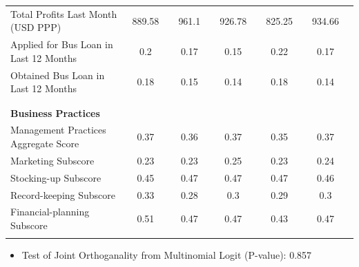 \documentclass[10pt]{beamer}
\begin{document}
\begin{frame}
{{\begin{table}
\begin{tabular}{l*{10}{c}}
Total Profits Last Month (USD PPP)						& 889.58	&& 961.1 &&	926.78	&& 825.25	&& 934.66 \\
Applied for Bus Loan in Last 12 Months
			    & 0.2	&& 0.17	&& 0.15	&& 0.22	&& 0.17 \\
													
Obtained Bus Loan in Last 12 Months
						& 0.18 &&	0.15	&& 0.14	&& 0.18	&& 0.14 \\[0.5ex]
\\
\\
\textbf{Business Practices} \\
Management Practices Aggregate Score											& 0.37	&& 0.36	&& 0.37	&& 0.35	&& 0.37 \\
\hspace{3mm}Marketing Subscore												& 0.23	&& 0.23 &&	0.25	&& 0.23	&& 0.24 \\
\hspace{3mm}Stocking-up	Subscore											& 0.45	&& 0.47	&& 0.47	&& 0.47	&& 0.46 \\
\hspace{3mm}Record-keeping Subscore											& 0.33	&& 0.28	&& 0.3	&& 0.29 &&	0.3 \\
\hspace{3mm}Financial-planning Subscore									& 0.51	&& 0.47	&& 0.47	&& 0.43	&& 0.47 \\
&		&&		&&		&& \\
		\hline
		\hline
			\end{tabular}
		
		
	\end{table}}}
\begin{itemize}
\item Test of Joint Orthoganality from Multinomial Logit (P-value): 0.857
\end{itemize}
\end{frame}
\end{document}
